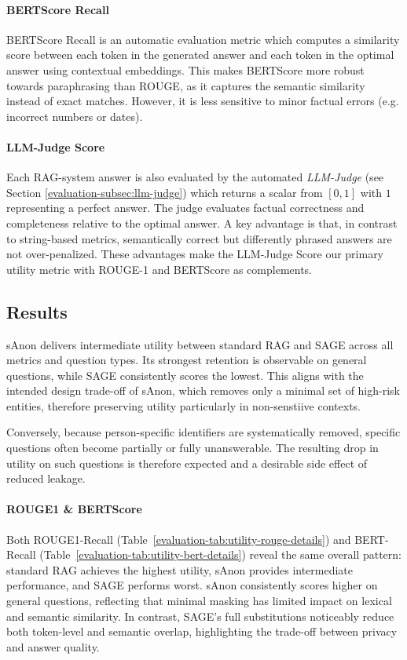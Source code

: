 \paragraph{BERTScore Recall} BERTScore Recall\cite{bertScore} is an automatic evaluation metric which computes a similarity score between each token in the generated answer and each token in the optimal answer using contextual embeddings. This makes BERTScore more robust towards paraphrasing than ROUGE, as it captures the semantic similarity instead of exact matches. However, it is less sensitive to minor factual errors (e.g. incorrect numbers or dates). 


\paragraph{LLM-Judge Score} Each \ac{RAG}-system answer is also evaluated by the automated \textit{LLM-Judge} (see Section \ref{evaluation-subsec:llm-judge}) which returns a scalar from $[0,1]$ with $1$ representing a perfect answer. The judge evaluates factual correctness and completeness relative to the optimal answer. A key advantage is that, in contrast to string-based metrics, semantically correct but differently phrased answers are not over-penalized. These advantages make the LLM-Judge Score our primary utility metric with ROUGE-1 and BERTScore as complements.



\subsection{Results}
sAnon delivers intermediate utility between standard RAG and SAGE across all metrics and question types. Its strongest retention is observable on general questions, while SAGE consistently scores the lowest. This aligns with the intended design trade-off of sAnon, which removes only a minimal set of high-risk entities, therefore preserving utility particularly in non-senstiive contexts. 

Conversely, because person-specific identifiers are systematically removed, specific questions often become partially or fully unanswerable. The resulting drop in utility on such questions is therefore expected and a desirable side effect of reduced leakage.

\paragraph{ROUGE1 \& BERTScore}
Both ROUGE1-Recall (Table~\ref{evaluation-tab:utility-rouge-details}) and BERT-Recall (Table~\ref{evaluation-tab:utility-bert-details}) reveal the same overall pattern: standard RAG achieves the highest utility, sAnon provides intermediate performance, and SAGE performs worst. sAnon consistently scores higher on general questions, reflecting that minimal masking has limited impact on lexical and semantic similarity. In contrast, SAGE's full substitutions noticeably reduce both token-level and semantic overlap, highlighting the trade-off between privacy and answer quality.

